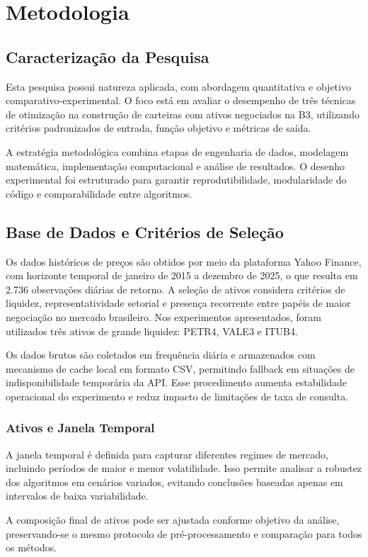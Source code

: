 \documentclass[
  12pt,
  oneside,
  a4paper,
  brazil
]{abntex2}
\begin{document}
\chapter{Metodologia}
\section{Caracterização da Pesquisa}
Esta pesquisa possui natureza aplicada, com abordagem quantitativa e objetivo comparativo-experimental. O foco está em avaliar o desempenho de três técnicas de otimização na construção de carteiras com ativos negociados na B3, utilizando critérios padronizados de entrada, função objetivo e métricas de saída.

A estratégia metodológica combina etapas de engenharia de dados, modelagem matemática, implementação computacional e análise de resultados. O desenho experimental foi estruturado para garantir reprodutibilidade, modularidade do código e comparabilidade entre algoritmos.

\section{Base de Dados e Critérios de Seleção}
Os dados históricos de preços são obtidos por meio da plataforma Yahoo Finance, com horizonte temporal de janeiro de 2015 a dezembro de 2025, o que resulta em 2.736 observações diárias de retorno. A seleção de ativos considera critérios de liquidez, representatividade setorial e presença recorrente entre papéis de maior negociação no mercado brasileiro. Nos experimentos apresentados, foram utilizados três ativos de grande liquidez: PETR4, VALE3 e ITUB4.

Os dados brutos são coletados em frequência diária e armazenados com mecanismo de cache local em formato CSV, permitindo fallback em situações de indisponibilidade temporária da API. Esse procedimento aumenta estabilidade operacional do experimento e reduz impacto de limitações de taxa de consulta.

\subsection{Ativos e Janela Temporal}
A janela temporal é definida para capturar diferentes regimes de mercado, incluindo períodos de maior e menor volatilidade. Isso permite analisar a robustez dos algoritmos em cenários variados, evitando conclusões baseadas apenas em intervalos de baixa variabilidade.

A composição final de ativos pode ser ajustada conforme objetivo da análise, preservando-se o mesmo protocolo de pré-processamento e comparação para todos os métodos.
\end{document}

